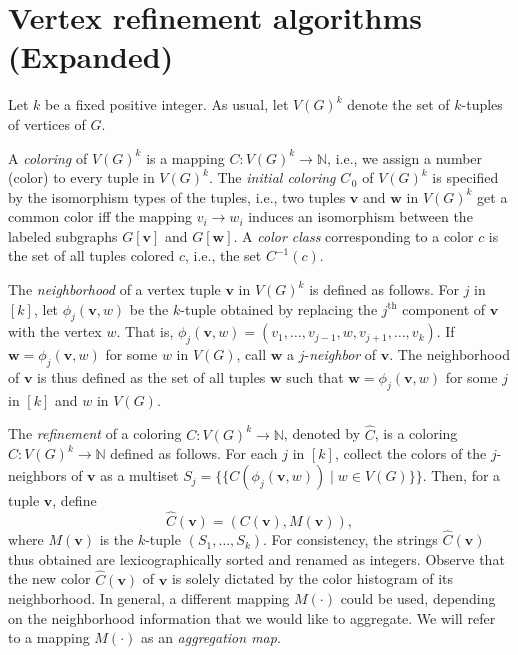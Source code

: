 \documentclass{article}
\theoremstyle{definition}
\newcommand{\new}[1]{\emph{#1}}
\renewcommand{\vec}[1]{\mathbf{#1}}
\begin{document}
\section{Vertex refinement algorithms (Expanded)}\label{vr}

Let $k$ be a fixed positive integer. As usual, let $V(G)^k$ denote the set of $k$-tuples of vertices of $G$. 

A \new{coloring} of $V(G)^k$ is a mapping $C \colon V(G)^k \to \mathbb{N}$, i.e., we assign a number (color) to every tuple in $V(G)^k$. The \new{initial coloring} $C_{\,0}$ of $V(G)^k$ is specified by the isomorphism types of the tuples, i.e., two tuples $\vec{v}$ and $\vec{w}$ in $V(G)^k$ get a common color iff the mapping $v_i \to w_i$ induces an isomorphism between the labeled subgraphs $G[\vec{v}]$ and $G[\vec{w}]$. A \new{color class} corresponding to a color $c$ is the set of all tuples colored $c$,
i.e., the set $C^{-1}(c)$. 

The \new{neighborhood} of a vertex tuple $\vec{v}$ in $V(G)^k$ is defined as follows. For $j$ in $[k]$, let $\phi_j(\vec{v},w)$ be the $k$-tuple obtained by replacing the 
$j^{\textrm{th}}\!$ component of $\vec{v}$ with the vertex $w$. That is, $\phi_j(\vec{v},w) = (v_1, \dots, v_{j-1}, w, v_{j+1}, \dots, v_k)$. If $\vec{w} = \phi_j(\vec{v},w)$ for some $w$ in $V(G)$, call $\vec{w}$ a $j$-\new{neighbor} of $\vec{v}$. The neighborhood of $\vec{v}$ is thus defined as the set of all tuples $\vec{w}$ such that $\vec{w} = \phi_j(\vec{v},w)$ for some $j$ in $[k]$ and $w$ in $V(G)$. 

The \emph{refinement} of a coloring $C \colon V(G)^k \to \mathbb{N}$, denoted by $\widehat{C}$, is a coloring $\widehat{C} \colon V(G)^k \to \mathbb{N}$ defined as follows. 
For each $j$ in $[k]$, collect the colors of the $j$-neighbors of $\vec{v}$ as a multiset $S_j=\{\!\! \{  C(\phi_j(\vec{v},w)) \mid w \in V(G) \} \!\!\}$.
Then, for a tuple $\vec{v}$, define
\[
\widehat{C}(\vec{v}) = (C(\vec{v}), M(\vec{v})),
\]
where $M(\vec{v})$ is the $k$-tuple $(S_1,\dots,S_k)$. For consistency, the strings $\widehat{C}(\vec{v})$ thus obtained are lexicographically sorted and renamed as integers. Observe that the new color $\widehat{C}(\vec{v})$ of $\vec{v}$ is solely dictated by the color histogram of its neighborhood. In general, a different mapping $M(\cdot)$ could be used, depending on the neighborhood information that we would like to aggregate. We will refer to a mapping $M(\cdot)$ as an \new{aggregation map}. 
\end{document}
